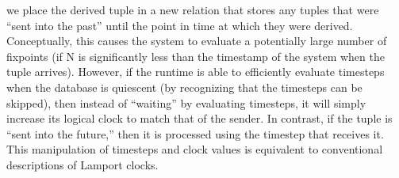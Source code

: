 we place the derived tuple in a new relation  that
stores any tuples that were ``sent into the past'' until the point in
time at which they were derived.  Conceptually, this causes the system
to evaluate a potentially large number of fixpoints (if N is
significantly less than the timestamp of the system when the tuple
arrives).  However, if the runtime is able to efficiently evaluate
timesteps when the database is quiescent (by recognizing that the
timesteps can be skipped), then instead of ``waiting'' by evaluating
timesteps, it will simply increase its logical clock to match that of
the sender.  In contrast, if the tuple is ``sent into the future,''
then it is processed using the timestep that receives it.  This
manipulation of timesteps and clock values is equivalent to
conventional descriptions of Lamport clocks.




